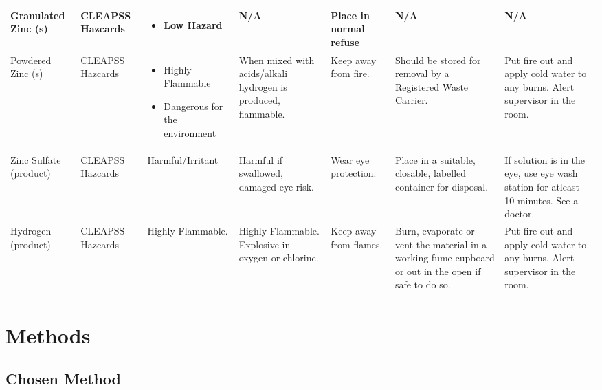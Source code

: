 \begin{landscape}
\begin{center}
\begin{longtable}{|p{1.5cm}|p{1.5cm}|p{3cm}|p{3cm}|p{3cm}|p{3cm}|p{2cm}|}
Granulated Zinc (s) &
CLEAPSS Hazcards &
\begin{itemize}
\item Low Hazard \end{itemize} &
N/A &
Place in normal refuse &
N/A &
N/A \\ \hline

Powdered Zinc (s) &
CLEAPSS Hazcards &
\begin{itemize}
\item Highly Flammable
\item Dangerous for the environment \end{itemize} &
When mixed with acids/alkali hydrogen is produced, flammable. &
Keep away from fire. &
Should be stored for removal by a Registered Waste Carrier. &
Put fire out and apply cold water to any burns. Alert supervisor in the room.
\\ \hline 

Zinc Sulfate (product) &
CLEAPSS Hazcards
& Harmful/Irritant
&Harmful if swallowed, damaged eye risk.
& Wear eye protection.
& Place in a suitable, closable, labelled container for disposal.
& If solution is in the eye, use eye wash station for atleast 10 minutes. See a doctor. 

\\ \hline

Hydrogen (product) &
CLEAPSS Hazcards
& Highly Flammable.
& Highly Flammable. Explosive in oxygen or chlorine. 
& Keep away from flames.
& Burn, evaporate or vent the material in a working fume cupboard or out in the open if safe to do so.
& Put fire out and apply cold water to any burns. Alert supervisor in the room.

\\ \hline



\end{longtable}
\label{tab:Risk Assessment Table}

\end{center}


\end{landscape}


\section{Methods}

	\subsection{Chosen Method} \label{Chosen Method}

